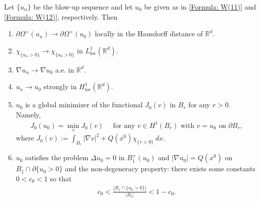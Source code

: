 \documentclass[11pt,reqno]{amsart}
\begin{document}
\begin{proposition}\label{Proposition: Properties of blow-up limits}
	Let $\{u_{n}\}$ be the blow-up sequence and let $u_{0}$ be given as in \eqref{Formula: W(11)} and \eqref{Formula: W(12)}, respectively. Then
	\begin{enumerate}
		\item $\partial\varOmega^{+}(u_{n})\to\partial\varOmega^{+}(u_{0})$ locally in the Hausdorff distance of $\mathbb{R}^{d}$.
		\item $\chi_{\{u_{n}>0\}}\to\chi_{\{u_{0}>0\}}$ in $L_{\mathrm{loc}}^{1}(\mathbb{R}^{d})$.
		\item $\nabla u_{n}\to\nabla u_{0}$ a.e. in $\mathbb{R}^{d}$.
		\item $u_{n}\to u_{0}$ strongly in $H_{\mathrm{loc}}^{1}(\mathbb{R}^{d})$.
		\item $u_{0}$ is a global minimizer of the functional $J_{0}(v)$ in $B_{r}$ for any $r>0$. Namely,
		\begin{align}\label{Formula: W(12')}
			J_{0}(u_{0})=\min_{v}J_{0}(v)\quad\text{ for any }v\in H^{1}(B_{r})\text{ with }v=u_{0}\text{ on }\partial B_{r},
		\end{align}
	   where $J_{0}(v):=\int_{B_{r}}|\nabla v|^{2}+Q(x^{0})\chi_{\{v>0\}}\:dx$.
	   \item $u_{0}$ satisfies the problem $\Delta u_{0}=0$ in $B_{1}^{+}(u_{0})$ and $|\nabla u_{0}|=Q(x^{0})$ on $B_{1}\cap\partial\{u_{0}>0\}$ and the non-degeneracy property: there exists some constants $0<c_{0}<1$ so that
	   \begin{align}\label{Formula: W(12'')}
	   	    c_{0}<\frac{|B_{1}\cap\{u_{0}>0\}|}{|B_{1}|}<1-c_{0}.
	   \end{align}
	\end{enumerate}
\end{proposition}
\end{document}
